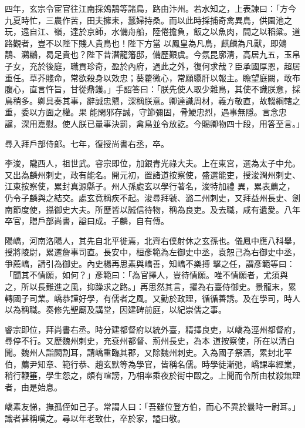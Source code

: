 \begin{pinyinscope}
 四年，玄宗令宦官往江南採鵁鶄等諸鳥，路由汴州。若水知之，上表諫曰：「方今九夏時忙，三農作苦，田夫擁耒，蠶婦持桑。而以此時採捕奇禽異鳥，供園池之玩，遠自江、嶺，達於京師，水備舟船，陸倦擔負，飯之以魚肉，間之以稻粱。道路觀者，豈不以陛下賤人貴鳥也！陛下方當
 以鳳皇為凡鳥，麒麟為凡獸，即鵁鶄、鸂鶒，曷足貴也？陛下昔潛龍籓邸，備歷艱虞。今氛昆廓清，高居九五，玉帛子女，充於後庭，職貢珍奇，盈於內府，過此之外，復何求哉？臣承國厚恩，超居重任。草芥賤命，常欲殺身以效忠；葵藿微心，常願隳肝以報主。瞻望庭闕，敢布腹心，直言忤旨，甘從鼎鑊。」手詔答曰：「朕先使人取少雜鳥，其使不識朕意，採鳥稍多。卿具奏其事，辭誠忠懇，深稱朕意。卿達識周材，義方敬直，故輟綱轄之重，委以方面之權。果
 能閑邪存誠，守節彌固，骨鯁忠烈，遇事無隱。言念忠讜，深用嘉慰。使人朕已量事決罰，禽鳥並令放訖。今賜卿物四十段，用答至言。」



 尋入拜戶部侍郎。七年，復授尚書右丞，卒。



 李浚，隴西人，祖世武。睿宗即位，加銀青光祿大夫。上在東宮，選為太子中允。又出為麟州刺史，政有能名。開元初，置諸道按察使，盛選能吏，授浚潤州刺史、江東按察使，累封真源縣子。州人孫處玄以學行著名，浚特加禮
 異，累表薦之，仍令子麟與之結交。處玄竟稱疾不起。浚尋拜虢、潞二州刺史，又拜益州長史、劍南節度使，攝御史大夫。所歷皆以誠信待物，稱為良吏。及去職，咸有遺愛。八年卒官，贈戶部尚書，謚曰成。子麟，自有傳。



 陽嶠，河南洛陽人，其先自北平徙焉，北齊右僕射休之玄孫也。儀鳳中應八科舉，授將陵尉，累遷詹事司直。長安中，桓彥範為左御史中丞，袁恕己為右御史中丞，爭薦嶠，請引為御史。內史楊再思素與嶠善，知嶠不樂搏
 擊之任，謂彥範等曰：「聞其不情願，如何？」彥範曰：「為官擇人，豈待情願。唯不情願者，尤須與之，所以長難進之風，抑躁求之路。」再思然其言，擢為右臺侍御史。景龍末，累轉國子司業。嶠恭謹好學，有儒者之風。又勤於政理，循循善誘。及在學司，時人以為稱職。奏修先聖廟及講堂，因建碑前庭，以紀崇儒之事。



 睿宗即位，拜尚書右丞。時分建都督府以統外臺，精擇良吏，以嶠為涇州都督府，尋停不行。又歷魏州刺史，充袞州都督、荊州長史，為本
 道按察使，所在以清白聞。魏州人詣闕割耳，請嶠重臨其郡，又除魏州刺史。入為國子祭酒，累封北平伯，薦尹知章、範行恭、趙玄默等為學官，皆稱名儒。時學徒漸弛，嶠課率經業，稍行鞭箠，學生怨之，頗有喧謗，乃相率乘夜於街中毆之。上聞而令所由杖殺無理者，由是始息。



 嶠素友悌，撫孤侄如己子。常謂人曰：「吾雖位登方伯，而心不異於曩時一尉耳。」識者甚稱嘆之。尋以年老致仕，卒於家，謚曰敬。




\end{pinyinscope}
